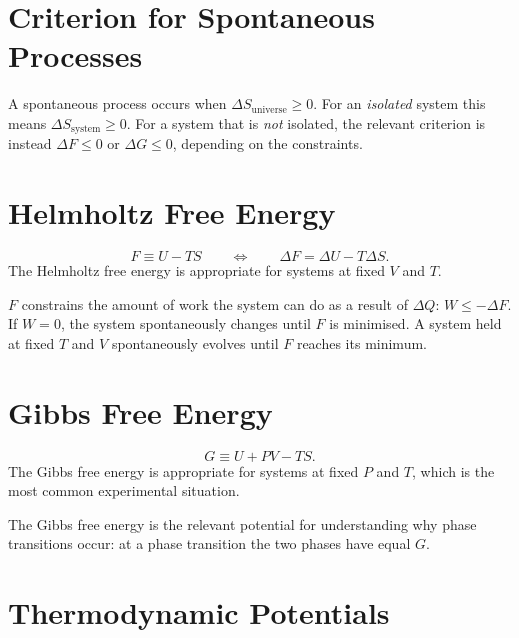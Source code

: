 \section{Criterion for Spontaneous Processes}

A spontaneous process occurs when $\Delta S_{\text{universe}} \geq 0$. For an \emph{isolated} system this means $\Delta S_{\text{system}} \geq 0$. For a system that is \emph{not} isolated, the relevant criterion is instead $\Delta F \leq 0$ or $\Delta G \leq 0$, depending on the constraints.

\section{Helmholtz Free Energy}

\begin{definition}
\begin{equation}
    F \equiv U - TS \qquad \Longleftrightarrow \qquad \Delta F = \Delta U - T\Delta S.
\end{equation}
The Helmholtz free energy is appropriate for systems at fixed $V$ and $T$.
\end{definition}

$F$ constrains the amount of work the system can do as a result of $\Delta Q$: $W \leq -\Delta F$. If $W = 0$, the system spontaneously changes until $F$ is minimised. A system held at fixed $T$ and $V$ spontaneously evolves until $F$ reaches its minimum.

\section{Gibbs Free Energy}

\begin{definition}
\begin{equation}
    G \equiv U + PV - TS.
\end{equation}
The Gibbs free energy is appropriate for systems at fixed $P$ and $T$, which is the most common experimental situation.
\end{definition}

The Gibbs free energy is the relevant potential for understanding why phase transitions occur: at a phase transition the two phases have equal $G$.

\section{Thermodynamic Potentials}

